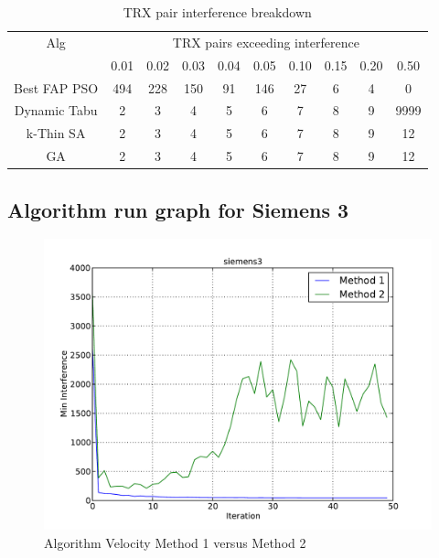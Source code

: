 \begin{table}[H]
\centering
	\begin{tabular}{cccccccccc}
	\toprule
    Alg & \multicolumn{9}{c}{TRX pairs exceeding interference}\\
    & 0.01 & 0.02 & 0.03 & 0.04 & 0.05 & 0.10 & 0.15 & 0.20 & 0.50 \\
    \midrule
    Best FAP PSO & 494 & 228 & 150 & 91 & 146 & 27 & 6 & 4 & 0 \\
    Dynamic Tabu & 2 & 3 & 4 & 5 & 6 & 7 & 8 & 9 & 9999\\
    k-Thin SA & 2 & 3 & 4 & 5 & 6 & 7 & 8 & 9 & 12\\
    GA & 2 & 3 & 4 & 5 & 6 & 7 & 8 & 9 & 12\\
    \bottomrule
	\end{tabular}
\caption{TRX pair interference breakdown}
\label{tab:breakdown-siem3m1}
\end{table}

\subsection{Algorithm run graph for Siemens 3}
\begin{figure}[H]
	\begin{centering}
    \includegraphics[scale=0.5]{../Implementation/data-cruncher/graph/siemens3.pdf}
	\caption{Algorithm Velocity Method 1 versus Method 2}
	\label{fig:siem3graph}
	\end{centering}
\end{figure}



